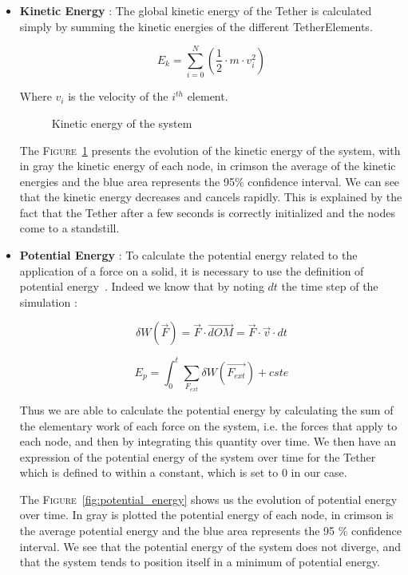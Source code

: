 \begin{itemize}
    \item \textbf{Kinetic Energy} : The global kinetic energy of the Tether is calculated simply by summing the kinetic energies of the different TetherElements.

    $$E_{k} = \sum_{i=0}^N \left(\frac{1}{2} \cdot m \cdot v_i^2 \right)$$
    
    Where $v_i$ is the velocity of the $i^{th}$ element.
    
    \begin{figure}[!htb]
        \centering
        
        \caption{Kinetic energy of the system}
        \label{fig:kinetic_energy}
    \end{figure}

    The \textsc{Figure}~\ref{fig:kinetic_energy} presents the evolution of the kinetic energy of the system, with in gray the kinetic energy of each node, in crimson the average of the kinetic energies and the blue area represents the 95\% confidence interval. We can see that the kinetic energy decreases and cancels rapidly. This is explained by the fact that the Tether after a few seconds is correctly initialized and the nodes come to a standstill.

    \item \textbf{Potential Energy} : To calculate the potential energy related to the application of a force on a solid, it is necessary to use the definition of potential energy~\cite{viegas_kinetic_2004}. Indeed we know that by noting $dt$ the time step of the simulation :

    $$\delta W(\overrightarrow{F}) = \overrightarrow{F} \cdot \overrightarrow{dOM} = \overrightarrow{F} \cdot \overrightarrow{v} \cdot dt$$
    
    $$E_p = \int_0^t \sum_{F_{ext}} \delta W(\overrightarrow{F_{ext}}) + cste$$
    
    Thus we are able to calculate the potential energy by calculating the sum of the elementary work of each force on the system, i.e. the forces that apply to each node, and then by integrating this quantity over time. We then have an expression of the potential energy of the system over time for the Tether which is defined to within a constant, which is set to $0$ in our case.
    
    The \textsc{Figure}~\ref{fig:potential_energy} shows us the evolution of potential energy over time. In gray is plotted the potential energy of each node, in crimson is the average potential energy and the blue area represents the 95 \% confidence interval. We see that the potential energy of the system does not diverge, and that the system tends to position itself in a minimum of potential energy.
    

\end{itemize}
